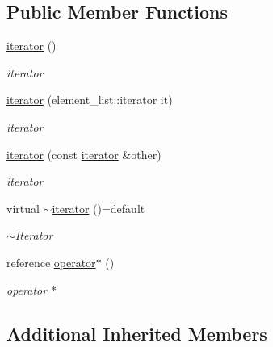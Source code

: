 \subsection*{Public Member Functions}
\begin{DoxyCompactItemize}
\item 
\hyperlink{classformat_1_1array_1_1iterator_abdf89f18e19ceaba55b348b50d4a0e61}{iterator} ()\hypertarget{classformat_1_1array_1_1iterator_abdf89f18e19ceaba55b348b50d4a0e61}{}\label{classformat_1_1array_1_1iterator_abdf89f18e19ceaba55b348b50d4a0e61}

\begin{DoxyCompactList}\small\item\em iterator \end{DoxyCompactList}\item 
\hyperlink{classformat_1_1array_1_1iterator_ac60fbed78ee29e41c017d75473ae0c2d}{iterator} (element\+\_\+list\+::iterator it)
\begin{DoxyCompactList}\small\item\em iterator \end{DoxyCompactList}\item 
\hyperlink{classformat_1_1array_1_1iterator_a940bc2cf6d3854281d8949eb879bd50a}{iterator} (const \hyperlink{classformat_1_1array_1_1iterator}{iterator} \&other)
\begin{DoxyCompactList}\small\item\em iterator \end{DoxyCompactList}\item 
virtual \hyperlink{classformat_1_1array_1_1iterator_aa8af0e6585ea44ed71f742ab2590da14}{$\sim$iterator} ()=default\hypertarget{classformat_1_1array_1_1iterator_aa8af0e6585ea44ed71f742ab2590da14}{}\label{classformat_1_1array_1_1iterator_aa8af0e6585ea44ed71f742ab2590da14}

\begin{DoxyCompactList}\small\item\em $\sim$\+Iterator \end{DoxyCompactList}\item 
reference \hyperlink{classformat_1_1array_1_1iterator_a3a5e953a8dcea660e44a324251e9a6bb}{operator$\ast$} ()
\begin{DoxyCompactList}\small\item\em operator $\ast$ \end{DoxyCompactList}\end{DoxyCompactItemize}
\subsection*{Additional Inherited Members}


